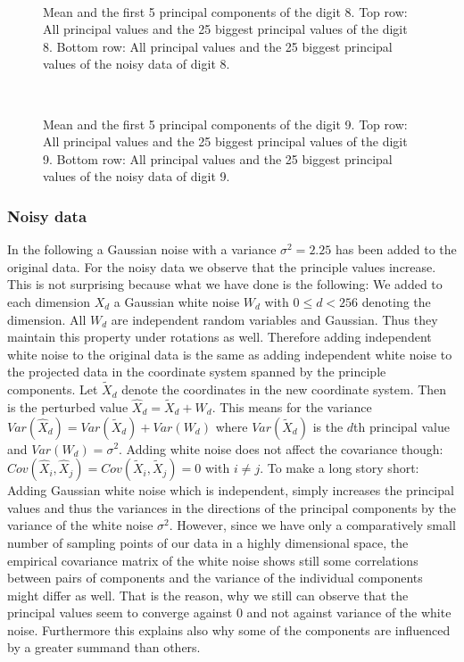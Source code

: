 \documentclass[a4paper, 12pt, titlepage]{article}
\begin{document}
\begin{figure}[H]
	\centering
	\\
	\caption{\protect{} Mean and the first 5 principal components of the digit 8. \protect{} Top row: All principal values and the 25 biggest principal values of the digit 8. Bottom row: All principal values and the 25 biggest principal values of the noisy data of digit 8.}
\end{figure}

	
\begin{figure}[H]
	\centering
	\\
	\caption{\protect{} Mean and the first 5 principal components of the digit 9. \protect{} Top row: All principal values and the 25 biggest principal values of the digit 9. Bottom row: All principal values and the 25 biggest principal values of the noisy data of digit 9.}
\end{figure}

\subsubsection*{Noisy data}

In the following a Gaussian noise with a variance $\sigma^2=2.25$ has been added to the original data.
For the noisy data we observe that the principle values increase.
This is not surprising because what we have done is the following:
We added to each dimension $X_d$ a Gaussian white noise $W_d$ with $0\le d < 256$ denoting the dimension.
All $W_d$ are independent random variables and Gaussian.
Thus they maintain this property under rotations as well.
Therefore adding independent white noise to the original data is the same as adding independent white noise to the projected data in the coordinate system spanned by the principle components.
Let $\tilde{X}_d$ denote the coordinates in the new coordinate system.
Then is the perturbed value $\hat{X}_d = \tilde{X}_d + W_d$.
This means for the variance $Var(\hat{X}_d) = Var(\tilde{X}_d) + Var(W_d)$ where $Var(\tilde{X}_d)$ is the $d$th principal value and $Var(W_d)=\sigma^2$.
Adding white noise does not affect the covariance though: $Cov(\hat{X}_i,\hat{X}_j) = Cov(\tilde{X}_i,\tilde{X}_j) = 0$ with $i\not = j$.
To make a long story short: Adding Gaussian white noise which is independent, simply increases the principal values and thus the variances in the directions of the principal components by the variance of the white noise $\sigma^2$.
However, since we have only a comparatively small number of sampling points of our data in a highly dimensional space, the empirical covariance matrix of the white noise shows still some correlations between pairs of components and the variance of the individual components might differ as well.
That is the reason, why we still can observe that the principal values seem to converge against $0$ and not against variance of the white noise.
Furthermore this explains also why some of the components are influenced by a greater summand than others.
\end{document}
